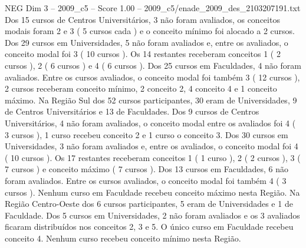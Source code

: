 \begin{textsample}{NEG Dim 3 – 2009\_c5 – Score 1.00 – 2009\_c5/enade\_2009\_des\_2103207191.txt}
Dos 15 cursos de Centros Universitários, 3 não foram avaliados, os conceitos modais foram 2 e 3 ( 5 cursos cada ) e o conceito mínimo foi alocado a 2 cursos.
Dos 29 cursos em Universidades, 5 não foram avaliados e, entre os avaliados, o conceito modal foi 3 ( 10 cursos ).
Os 14 restantes receberam conceitos 1 ( 2 cursos ), 2 ( 6 cursos ) e 4 ( 6 cursos ).
Dos 25 cursos em Faculdades, 4 não foram avaliados.
Entre os cursos avaliados, o conceito modal foi também 3 ( 12 cursos ), 2 cursos receberam conceito mínimo, 2 conceito 2, 4 conceito 4 e 1 conceito máximo.
Na Região Sul dos 52 cursos participantes, 30 eram de Universidades, 9 de Centros Universitários e 13 de Faculdades.
Dos 9 cursos de Centros Universitários, 4 não foram avaliados, o conceito modal entre os avaliados foi 4 ( 3 cursos ), 1 curso recebeu conceito 2 e 1 curso o conceito 3.
Dos 30 cursos em Universidades, 3 não foram avaliados e, entre os avaliados, o conceito modal foi 4 ( 10 cursos ).
Os 17 restantes receberam conceitos 1 ( 1 curso ), 2 ( 2 cursos ), 3 ( 7 cursos ) e conceito máximo ( 7 cursos ).
Dos 13 cursos em Faculdades, 6 não foram avaliados.
Entre os cursos avaliados, o conceito modal foi também 4 ( 3 cursos ).
Nenhum curso em Faculdade recebeu conceito máximo nesta Região.
Na Região Centro-Oeste dos 6 cursos participantes, 5 eram de Universidades e 1 de Faculdade.
Dos 5 cursos em Universidades, 2 não foram avaliados e os 3 avaliados ficaram distribuídos nos conceitos 2, 3 e 5.
O único curso em Faculdade recebeu conceito 4.
Nenhum curso recebeu conceito mínimo nesta Região.

\end{textsample}
